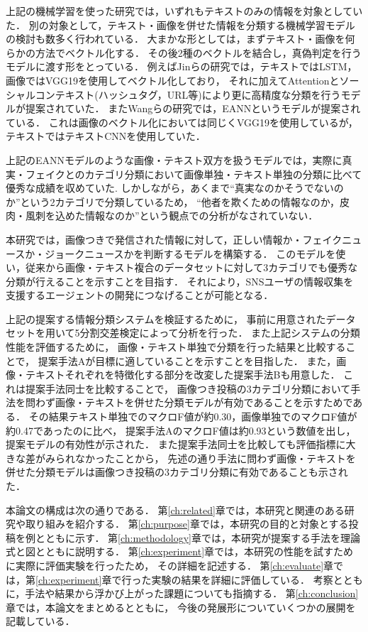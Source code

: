 上記の機械学習を使った研究では，いずれもテキストのみの情報を対象としていた．
別の対象として，テキスト・画像を併せた情報を分類する機械学習モデルの検討も数多く行われている．
大まかな形としては，まずテキスト・画像を何らかの方法でベクトル化する．
その後2種のベクトルを結合し，真偽判定を行うモデルに渡す形をとっている．
例えばJinらの研究\cite{Jin:2017:MFR:3123266.3123454}では，テキストではLSTM，画像ではVGG19を使用してベクトル化しており，
それに加えてAttentionとソーシャルコンテキスト(ハッシュタグ，URL等)により更に高精度な分類を行うモデルが提案されていた．
またWangらの研究\cite{Wang:2018:EEA:3219819.3219903}では，EANNというモデルが提案されている．
これは画像のベクトル化においては同じくVGG19を使用しているが，テキストではテキストCNNを使用していた．

上記のEANNモデルのような画像・テキスト双方を扱うモデルでは，実際に真実・フェイクとのカテゴリ分類において画像単独・テキスト単独の分類に比べて優秀な成績を収めていた\cite{Wang:2018:EEA:3219819.3219903}.\@
しかしながら，あくまで``真実なのかそうでないのか''という2カテゴリで分類しているため，
``他者を欺くための情報なのか，皮肉・風刺を込めた情報なのか''という観点での分析がなされていない．

本研究では，画像つきで発信された情報に対して，正しい情報か・フェイクニュースか・ジョークニュースかを判断するモデルを構築する．
このモデルを使い，従来から画像・テキスト複合のデータセットに対して3カテゴリでも優秀な分類が行えることを示すことを目指す．
それにより，SNSユーザの情報収集を支援するエージェントの開発につなげることが可能となる．

上記の提案する情報分類システムを検証するために，
事前に用意されたデータセットを用いて5分割交差検定によって分析を行った．
また上記システムの分類性能を評価するために，
画像・テキスト単独で分類を行った結果と比較することで，
提案手法Aが目標に適していることを示すことを目指した．
また，画像・テキストそれぞれを特徴化する部分を改変した提案手法Bも用意した．
これは提案手法同士を比較することで，
画像つき投稿の3カテゴリ分類において手法を問わず画像・テキストを併せた分類モデルが有効であることを示すためである．
その結果テキスト単独でのマクロF値が約0.30，画像単独でのマクロF値が約0.47であったのに比べ，
提案手法AのマクロF値は約0.93という数値を出し，提案モデルの有効性が示された．
また提案手法同士を比較しても評価指標に大きな差がみられなかったことから，
先述の通り手法に問わず画像・テキストを併せた分類モデルは画像つき投稿の3カテゴリ分類に有効であることも示された．

本論文の構成は次の通りである．
第\ref{ch:related}章では，本研究と関連のある研究や取り組みを紹介する．
第\ref{ch:purpose}章では，本研究の目的と対象とする投稿を例とともに示す．
第\ref{ch:methodology}章では，本研究が提案する手法を理論式と図とともに説明する．
第\ref{ch:experiment}章では，本研究の性能を試すために実際に評価実験を行ったため，
その詳細を記述する．
第\ref{ch:evaluate}章では，第\ref{ch:experiment}章で行った実験の結果を詳細に評価している．
考察とともに，手法や結果から浮かび上がった課題についても指摘する．
第\ref{ch:conclusion}章では，本論文をまとめるとともに，
今後の発展形についていくつかの展開を記載している．